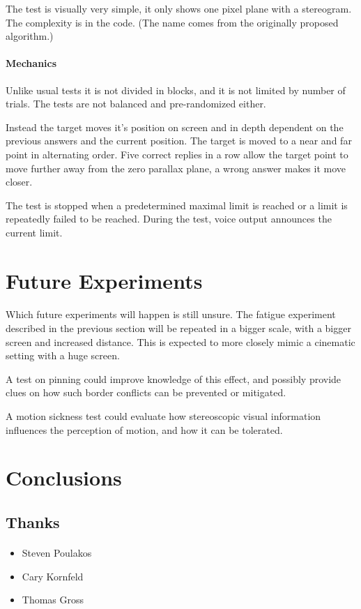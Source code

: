 The test is visually very simple, it only shows one pixel plane with a stereogram.
The complexity is in the code.
(The name comes from the originally proposed algorithm.)

\paragraph{Mechanics}
Unlike usual tests it is not divided in blocks, and it is not limited by number of trials.
The tests are not balanced and pre-randomized either.

Instead the target moves it's position on screen and in depth dependent on the previous answers and the current position.
The target is moved to a near and far point in alternating order.
Five correct replies in a row allow the target point to move further away from the zero parallax plane,
a wrong answer makes it move closer.

The test is stopped when a predetermined maximal limit is reached or a limit is repeatedly failed to be reached.
During the test, voice output announces the current limit.


\section{Future Experiments}
\paragraph{}
Which future experiments will happen is still unsure.
The fatigue experiment described in the previous section will be repeated in a bigger scale, with a bigger screen and increased distance.
This is expected to more closely mimic a cinematic setting with a huge screen.

A test on pinning could improve knowledge of this effect, and possibly provide clues on how such border conflicts can be prevented or mitigated.

A motion sickness test could evaluate how stereoscopic visual information influences the perception of motion, and how it can be tolerated.


\section{Conclusions}
\paragraph{}

\subsection{Thanks}
\paragraph{}
\begin{itemize}
\item Steven Poulakos
\item Cary Kornfeld
\item Thomas Gross
\end{itemize}

